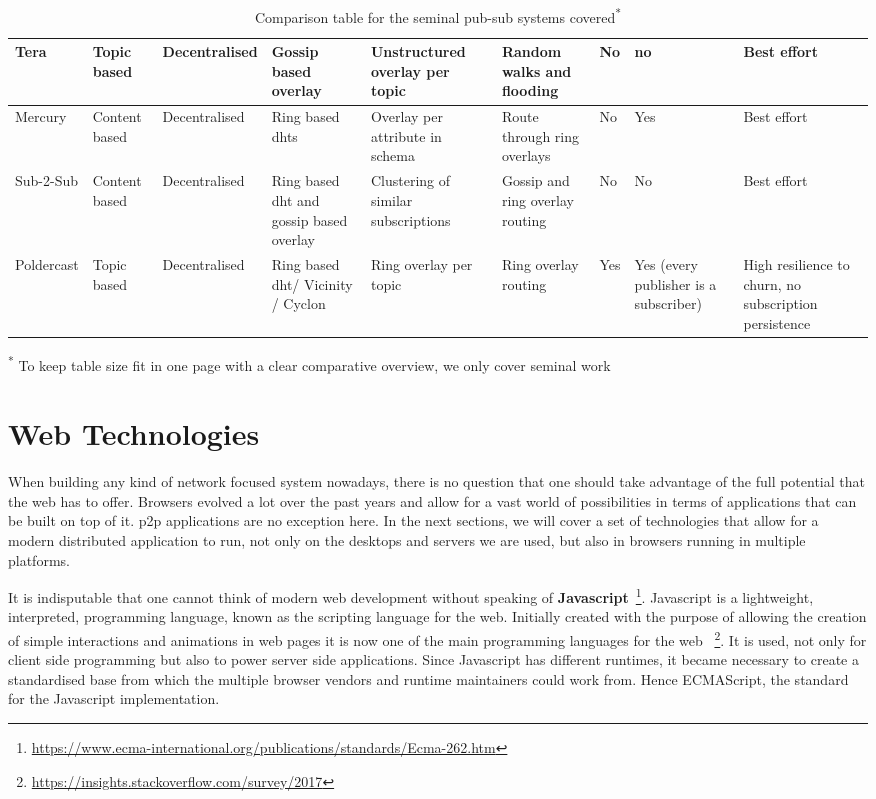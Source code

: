 \begin{table}
\begin{tabular}{|P{3cm}|P{2cm}P{2cm}P{2cm}P{2.5cm}P{2cm}P{2cm}P{2cm}P{2cm}|}
    Tera \cite{Baldoni2007} & Topic based & Decentralised & Gossip based overlay & Unstructured overlay per topic & Random walks and flooding & No & no & Best effort \\\hline
    Mercury \cite{Bharambe2002} & Content based & Decentralised & Ring based \acrshort{dht}s & Overlay per attribute in schema & Route through ring overlays & No & Yes & Best effort \\\hline
    Sub-2-Sub \cite{Voulgaris2005} & Content based & Decentralised & Ring based \acrshort{dht} and gossip based overlay & Clustering of similar subscriptions & Gossip and ring overlay routing & No & No & Best effort \\\hline
    Poldercast \cite{Setty2012} & Topic based & Decentralised & Ring based \acrshort{dht}/ Vicinity / Cyclon & Ring overlay per topic & Ring overlay routing & Yes & Yes (every publisher is a subscriber) & High resilience to churn, no subscription persistence \\\hline
    \end{tabular}
    \caption{Comparison table for the seminal pub-sub systems covered\textsuperscript{*}}
    \small\textsuperscript{*} To keep table size fit in one page with a clear comparative overview, we only cover seminal work
  \label{table:relevant-systems}
\end{table}

\section{Web Technologies}\label{web-technologies}

When building any kind of network focused system nowadays, there is no question
that one should take advantage of the full potential that the web has to offer.
Browsers evolved a lot over the past years and allow for a vast world of
possibilities in terms of applications that can be built on top of it. \acrshort{p2p}
applications are no exception here. In the next sections, we will cover a set
of technologies that allow for a modern distributed application to run, not
only on the desktops and servers we are used, but also in browsers running in
multiple platforms.

It is indisputable that one cannot think of modern web development
without speaking of \textbf{Javascript}~\footnote{\url{https://www.ecma-international.org/publications/standards/Ecma-262.htm}}.
Javascript is a lightweight, interpreted, programming language, known as
the scripting language for the web. Initially created with the purpose
of allowing the creation of simple interactions and animations in web
pages it is now one of the main programming languages for the web
~\footnote{\url{https://insights.stackoverflow.com/survey/2017}}. It is used, not
only for client side programming but also to power server side
applications. Since Javascript has different runtimes, it became
necessary to create a standardised base from which the multiple browser
vendors and runtime maintainers could work from. Hence ECMAScript, the standard
for the Javascript implementation.

